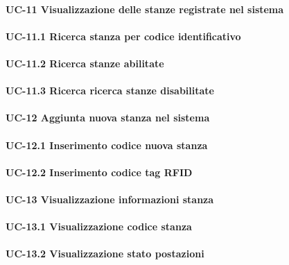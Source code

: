 
\paragraph{UC-11 Visualizzazione delle stanze registrate nel sistema}

    \paragraph{UC-11.1 Ricerca stanza per codice identificativo}

    \paragraph{UC-11.2 Ricerca stanze abilitate}

    \paragraph{UC-11.3 Ricerca ricerca stanze disabilitate}


\paragraph{UC-12 Aggiunta nuova stanza nel sistema}

    \paragraph{UC-12.1 Inserimento codice nuova stanza}

    \paragraph{UC-12.2 Inserimento codice tag RFID} %


\paragraph{UC-13 Visualizzazione informazioni stanza}

    \paragraph{UC-13.1 Visualizzazione codice stanza}

    \paragraph{UC-13.2 Visualizzazione stato postazioni}

